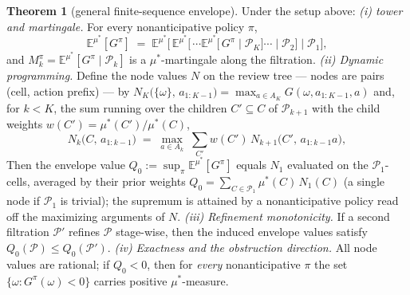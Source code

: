 \documentclass[10pt,twocolumn]{article}
\theoremstyle{definition}
\newtheorem{theorem}{Theorem}
\begin{document}
\begin{theorem}[general finite-sequence envelope]\label{thm:general}
Under the setup above: \emph{(i) tower and martingale.} For every
nonanticipative policy $\pi$,
\[
\mathbb{E}^{\mu^{*}}[G^{\pi}] \;=\;
\mathbb{E}^{\mu^{*}}\bigl[\, \mathbb{E}^{\mu^{*}}\bigl[\, \cdots
\mathbb{E}^{\mu^{*}}[\, G^{\pi} \mid \mathcal{P}_{K} \bigr] \cdots
\mid \mathcal{P}_{2} \bigr] \mid \mathcal{P}_{1} \bigr],
\]
and $M^{\pi}_{k} = \mathbb{E}^{\mu^{*}}[G^{\pi} \mid
\mathcal{P}_{k}]$ is a $\mu^{*}$-martingale along the filtration.
\emph{(ii) Dynamic programming.} Define the node values $N$ on the
review tree --- nodes are pairs (cell, action prefix) --- by
$N_{K}\bigl(\{\omega\},\, a_{1:K-1}\bigr) = \max_{a \in A_{K}}
G(\omega, a_{1:K-1}, a)$ and, for $k < K$, the sum running over the
children $C' \subseteq C$ of $\mathcal{P}_{k+1}$ with the child weights
$w(C') = \mu^{*}(C')/\mu^{*}(C)$,
\[
N_{k}\bigl(C,\, a_{1:k-1}\bigr)
\;=\; \max_{a \in A_{k}} \;
\sum_{C'} w(C')\, N_{k+1}\bigl(C',\, a_{1:k-1}a\bigr),
\]
Then the envelope value $Q_{0} := \sup_{\pi}
\mathbb{E}^{\mu^{*}}[G^{\pi}]$ equals $N_{1}$ evaluated on the
$\mathcal{P}_{1}$-cells, averaged by their prior weights
$Q_{0} = \sum_{C \in \mathcal{P}_{1}} \mu^{*}(C)\,
N_{1}(C)$ (a single node if $\mathcal{P}_{1}$ is trivial); the supremum
is attained by a nonanticipative policy read off the maximizing
arguments of $N$. \emph{(iii) Refinement monotonicity.} If a second
filtration $\mathcal{P}'$ refines $\mathcal{P}$ stage-wise, then the
induced envelope values satisfy $Q_{0}(\mathcal{P}) \le
Q_{0}(\mathcal{P}')$. \emph{(iv) Exactness and the obstruction
direction.} All node values are rational; if $Q_{0} < 0$, then for
\emph{every} nonanticipative $\pi$ the set
$\{\omega: G^{\pi}(\omega) < 0\}$ carries positive $\mu^{*}$-measure.
\end{theorem}
\end{document}
